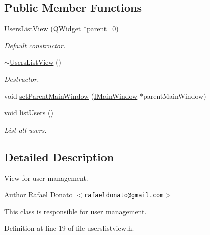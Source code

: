 \subsection*{\-Public \-Member \-Functions}
\begin{DoxyCompactItemize}
\item 
\hyperlink{class_users_list_view_ac08553cff2b680b774809c6010eecf72}{\-Users\-List\-View} (\-Q\-Widget $\ast$parent=0)
\begin{DoxyCompactList}\small\item\em \-Default constructor. \end{DoxyCompactList}\item 
\hyperlink{class_users_list_view_a7de500f814a5381db2c8be87ab464dfc}{$\sim$\-Users\-List\-View} ()
\begin{DoxyCompactList}\small\item\em \-Destructor. \end{DoxyCompactList}\item 
void \hyperlink{class_users_list_view_aef39aa8e53d72ba34e31d39c1171c0ca}{set\-Parent\-Main\-Window} (\hyperlink{class_i_main_window}{\-I\-Main\-Window} $\ast$parent\-Main\-Window)
\item 
void \hyperlink{class_users_list_view_a8b688f8cbaa77327a8049b75d184f622}{list\-Users} ()
\begin{DoxyCompactList}\small\item\em \-List all users. \end{DoxyCompactList}\end{DoxyCompactItemize}


\subsection{\-Detailed \-Description}
\-View for user management. 

\begin{DoxyAuthor}{\-Author}
\-Rafael \-Donato $<$\href{mailto:rafaeldonato@gmail.com}{\tt rafaeldonato@gmail.\-com}$>$
\end{DoxyAuthor}
\-This class is responsible for user management. 

\-Definition at line 19 of file userslistview.\-h.



